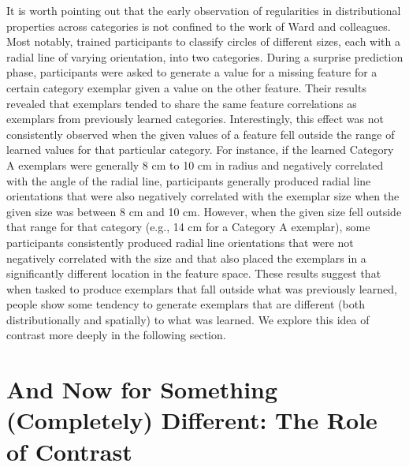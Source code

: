 \documentclass[pdflatex,sn-apa]{sn-jnl}%
\theoremstyle{thmstyleone}%
\theoremstyle{thmstyletwo}%
\theoremstyle{thmstylethree}%
\begin{document}
It is worth pointing out that the early observation of regularities in
distributional properties across categories is not confined to the work of Ward
and colleagues. Most notably, \citet{thomas98} trained participants to classify
circles of different sizes, each with a radial line of varying orientation, into
two categories. During a surprise prediction phase, participants were asked to
generate a value for a missing feature for a certain category exemplar given a
value on the other feature. Their results revealed that exemplars tended to
share the same feature correlations as exemplars from previously learned
categories. Interestingly, this effect was not consistently observed when the
given values of a feature fell outside the range of learned values for that
particular category. For instance, if the learned Category A exemplars were
generally 8 cm to 10 cm in radius and negatively correlated with the angle of
the radial line, participants generally produced radial line orientations that
were also negatively correlated with the exemplar size when the given size was
between 8 cm and 10 cm. However, when the given size fell outside that range for
that category (e.g., 14 cm for a Category A exemplar), some participants
consistently produced radial line orientations that were not negatively
correlated with the size and that also placed the exemplars in a significantly
different location in the feature space. These results suggest that when tasked
to produce exemplars that fall outside what was previously learned, people show
some tendency to generate exemplars that are different (both distributionally
and spatially) to what was learned. We explore this idea of contrast
more deeply in the following section.

\section{And Now for Something (Completely) Different: The Role of Contrast}

\end{document}

